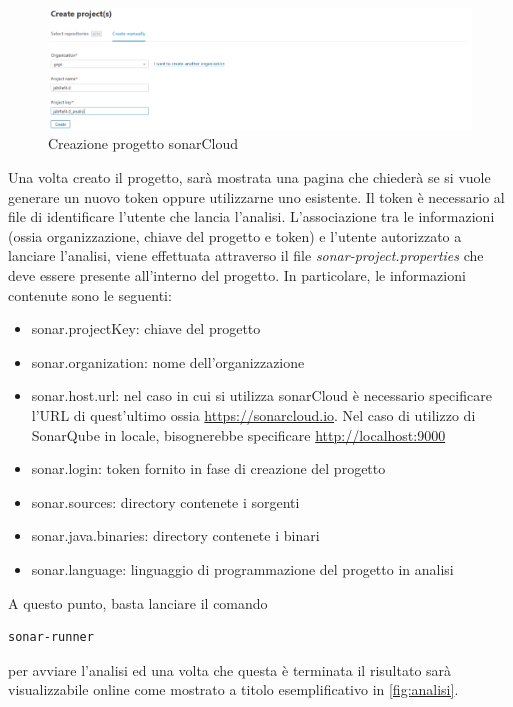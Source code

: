 \begin{figure}[htbp]
	\centering
	\includegraphics[scale=0.3, trim = 0cm 0cm 0cm 0cm, clip=true]{figSonarCloud/progetto.PNG}
	\caption{Creazione progetto sonarCloud}
	\label{fig:prog}
\end{figure}
Una volta creato il progetto, sarà mostrata una pagina che chiederà se si vuole generare un nuovo token oppure utilizzarne uno esistente. Il token è necessario al file di identificare l'utente che lancia l'analisi. L'associazione tra le informazioni (ossia organizzazione, chiave del progetto e token) e l'utente autorizzato a lanciare l'analisi, viene effettuata attraverso il file \textit{sonar-project.properties} che deve essere presente all'interno del progetto. In particolare, le informazioni contenute sono le seguenti:
\begin{itemize}
	\item 	sonar.projectKey: chiave del progetto
	\item 	sonar.organization: nome dell'organizzazione
	\item 	sonar.host.url: nel caso in cui si utilizza sonarCloud è necessario specificare l'URL di quest'ultimo ossia \url{https://sonarcloud.io}. Nel caso di utilizzo di SonarQube in locale, bisognerebbe specificare \url{http://localhost:9000}
	\item 	sonar.login: token fornito in fase di creazione del progetto
	\item sonar.sources: directory contenete i sorgenti
	\item sonar.java.binaries: directory contenete i binari
	\item sonar.language: linguaggio di programmazione del progetto in analisi
\end{itemize}


A questo punto, basta lanciare il comando 
\begin{verbatim}
sonar-runner
\end{verbatim}
per avviare l'analisi ed una volta che questa è terminata il risultato sarà visualizzabile online come mostrato a titolo esemplificativo in \autoref{fig:analisi}.
	
